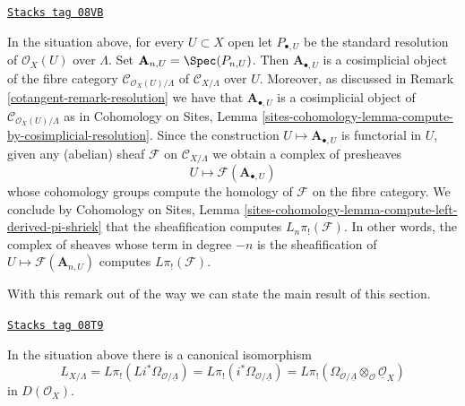 \begin{remark}
\label{cotangent-remark-compute-L-pi-shriek}
\href{https://stacks.math.columbia.edu/tag/08VB}{\texttt{Stacks tag 08VB}}

In the situation above, for every $U \subset X$ open let
$P_{\bullet, U}$ be the standard resolution of $\mathcal{O}_X(U)$
over $\Lambda$. Set $\mathbf{A}_{n, U} = \Spec(P_{n, U})$. Then
$\mathbf{A}_{\bullet, U}$
is a cosimplicial object of the fibre category
$\mathcal{C}_{\mathcal{O}_X(U)/\Lambda}$ of
$\mathcal{C}_{X/\Lambda}$ over $U$. Moreover, as discussed
in Remark \ref{cotangent-remark-resolution} we have that $\mathbf{A}_{\bullet, U}$
is a cosimplicial object of $\mathcal{C}_{\mathcal{O}_X(U)/\Lambda}$
as in Cohomology on Sites, Lemma
\ref{sites-cohomology-lemma-compute-by-cosimplicial-resolution}.
Since the construction $U \mapsto \mathbf{A}_{\bullet, U}$ is functorial
in $U$, given any (abelian) sheaf $\mathcal{F}$ on $\mathcal{C}_{X/\Lambda}$
we obtain a complex of presheaves
$$
U \longmapsto \mathcal{F}(\mathbf{A}_{\bullet, U})
$$
whose cohomology groups compute the homology of $\mathcal{F}$ on the fibre
category. We conclude by
Cohomology on Sites, Lemma
\ref{sites-cohomology-lemma-compute-left-derived-pi-shriek}
that the sheafification computes $L_n\pi_!(\mathcal{F})$.
In other words, the complex of sheaves whose term in degree $-n$ is
the sheafification of $U \mapsto \mathcal{F}(\mathbf{A}_{n, U})$ computes
$L\pi_!(\mathcal{F})$.
\end{remark}

With this remark out of the way we can state the main
result of this section.

\begin{lemma}
\label{cotangent-lemma-cotangent-morphism-schemes}
\href{https://stacks.math.columbia.edu/tag/08T9}{\texttt{Stacks tag 08T9}}

In the situation above there is a canonical isomorphism
$$
L_{X/\Lambda} =
L\pi_!(Li^*\Omega_{\mathcal{O}/\underline{\Lambda}}) =
L\pi_!(i^*\Omega_{\mathcal{O}/\underline{\Lambda}}) =
L\pi_!(\Omega_{\mathcal{O}/\underline{\Lambda}}
\otimes_\mathcal{O} \underline{\mathcal{O}}_X)
$$
in $D(\mathcal{O}_X)$.
\end{lemma}

